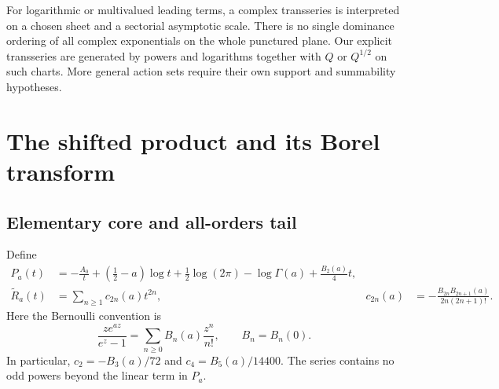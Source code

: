 \documentclass[11pt,a4paper]{article}
\numberwithin{equation}{section}
\theoremstyle{definition}
\theoremstyle{remark}
\newcommand{\wt}{\widetilde}
\begin{document}
For logarithmic or multivalued leading terms, a complex transseries is interpreted on a chosen sheet and a sectorial asymptotic scale. There is no single dominance ordering of all complex exponentials on the whole punctured plane. Our explicit transseries are generated by powers and logarithms together with $Q$ or $Q^{1/2}$ on such charts. More general action sets require their own support and summability hypotheses.

\section{The shifted product and its Borel transform}
\label{sec:borel}

\subsection{Elementary core and all-orders tail}
Define
\begin{align}
 P_a(t)&=-\frac{A_0}{t}+\left(\frac12-a\right)\log t
       +\frac12\log(2\pi)-\log\Gamma(a)+\frac{B_2(a)}4t,
       \label{eq:core}\\
 \wt R_a(t)&=\sum_{n\geq1}c_{2n}(a)t^{2n},
 &c_{2n}(a)&=-\frac{B_{2n}B_{2n+1}(a)}{2n(2n+1)!}.
 \label{eq:tail}
\end{align}
Here the Bernoulli convention is
\begin{equation}
 \frac{ze^{az}}{e^z-1}=\sum_{n\geq0}B_n(a)\frac{z^n}{n!},
 \qquad B_n=B_n(0).
 \label{eq:bernoulli}
\end{equation}
In particular, $c_2=-B_3(a)/72$ and $c_4=B_5(a)/14400$. The series contains no odd powers beyond the linear term in $P_a$.
\end{document}
